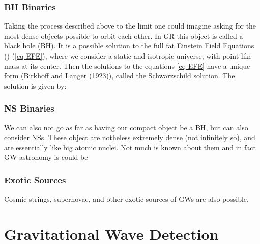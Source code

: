 \documentclass[
  letterpaper,
  DIV=11,
  numbers=noendperiod,
  oneside]{scrreprt}
\begin{document}
\hypertarget{binaries}{%
\subsection{\texorpdfstring{{BH}
Binaries}{BH Binaries}}\label{binaries}}

Taking the process described above to the limit one could imagine asking
for the most dense objects possible to orbit each other. In {GR} this
object is called a black hole ({BH}). It is a possible solution to the
full fat Einstein Field Equations () (\ref{eq-EFE}), where we consider a
static and isotropic universe, with point like mass at its center. Then
the solutions to the equations \ref{eq-EFE} have a unique form (Birkhoff
and Langer
(1923)),
called the Schwarzschild solution. The solution is given by:

\hypertarget{binaries-1}{%
\subsection{\texorpdfstring{{NS}
Binaries}{NS Binaries}}\label{binaries-1}}

We can also not go as far as having our compact object be a {BH}, but
can also consider {NS}s. These object are notheless extremely dense (not
infinitely so), and are essentially like big atomic nuclei. Not much is
known about them and in fact {GW} astronomy is could be

\hypertarget{exotic-sources}{%
\subsection{Exotic Sources}\label{exotic-sources}}

Cosmic strings, supernovae, and other exotic sources of {GW}s are also
possible.


\hypertarget{gravitational-wave-detection}{%
\chapter{Gravitational Wave
Detection}\label{gravitational-wave-detection}}
\end{document}

